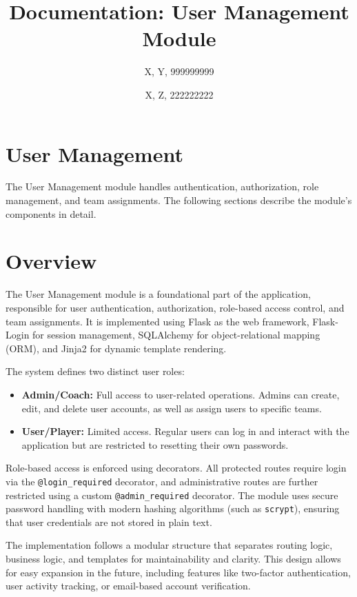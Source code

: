 \documentclass[12pt]{article}
\title{Documentation: User Management Module}
\author{X, Y, 999999999\\ \and X, Z, 222222222}
\date{}
\begin{document}
\maketitle
\tableofcontents
\newpage

\section*{User Management}

The User Management module handles authentication, authorization, role management, and team assignments. The following sections describe the module's components in detail.

\section{Overview}

The User Management module is a foundational part of the application, responsible for user authentication, authorization, role-based access control, and team assignments. It is implemented using Flask as the web framework, Flask-Login for session management, SQLAlchemy for object-relational mapping (ORM), and Jinja2 for dynamic template rendering.

The system defines two distinct user roles:
\begin{itemize}
  \item \textbf{Admin/Coach:} Full access to user-related operations. Admins can create, edit, and delete user accounts, as well as assign users to specific teams.
  \item \textbf{User/Player:} Limited access. Regular users can log in and interact with the application but are restricted to resetting their own passwords.
\end{itemize}
\noindent Role-based access is enforced using decorators. All protected routes require login via the \texttt{@login\_required} decorator, and administrative routes are further restricted using a custom \texttt{@admin\_required} decorator. The module uses secure password handling with modern hashing algorithms (such as \texttt{scrypt}), ensuring that user credentials are not stored in plain text.

\noindent The implementation follows a modular structure that separates routing logic, business logic, and templates for maintainability and clarity. This design allows for easy expansion in the future, including features like two-factor authentication, user activity tracking, or email-based account verification.
\end{document}
